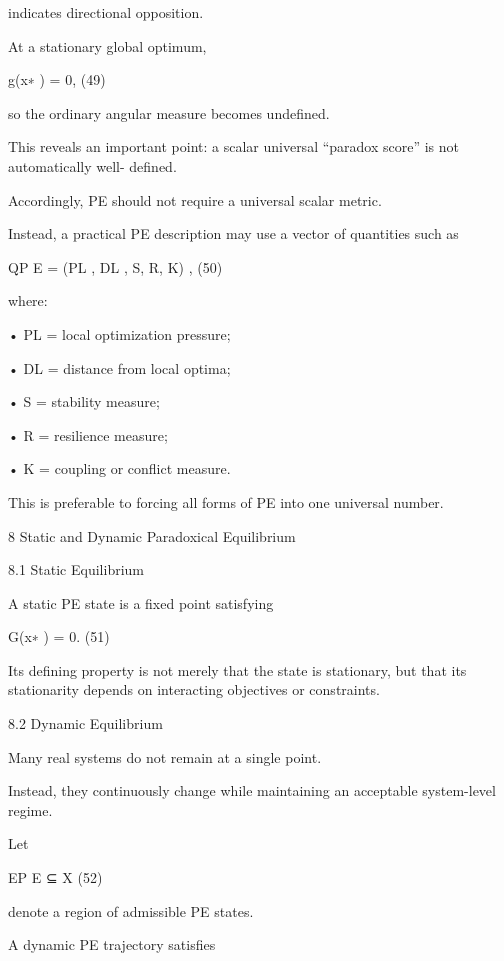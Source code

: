 \documentclass[10pt,a4paper]{article}
\begin{document}
\begin{ManuscriptText}
indicates directional opposition.

At a stationary global optimum,


                                            g(x∗ ) = 0,                                  (49)

so the ordinary angular measure becomes undefined.

This reveals an important point: a scalar universal “paradox score” is not automatically well-
defined.

Accordingly, PE should not require a universal scalar metric.

Instead, a practical PE description may use a vector of quantities such as


                                    QP E = (PL , DL , S, R, K) ,                         (50)

where:


  • PL = local optimization pressure;

  • DL = distance from local optima;

  • S = stability measure;

  • R = resilience measure;

  • K = coupling or conflict measure.


This is preferable to forcing all forms of PE into one universal number.


8     Static and Dynamic Paradoxical Equilibrium

8.1   Static Equilibrium

A static PE state is a fixed point satisfying


                                            G(x∗ ) = 0.                                        (51)

Its defining property is not merely that the state is stationary, but that its stationarity depends
on interacting objectives or constraints.


8.2   Dynamic Equilibrium

Many real systems do not remain at a single point.

Instead, they continuously change while maintaining an acceptable system-level regime.

Let


                                            EP E ⊆ X                                           (52)

denote a region of admissible PE states.

A dynamic PE trajectory satisfies



\end{ManuscriptText}
\end{document}
